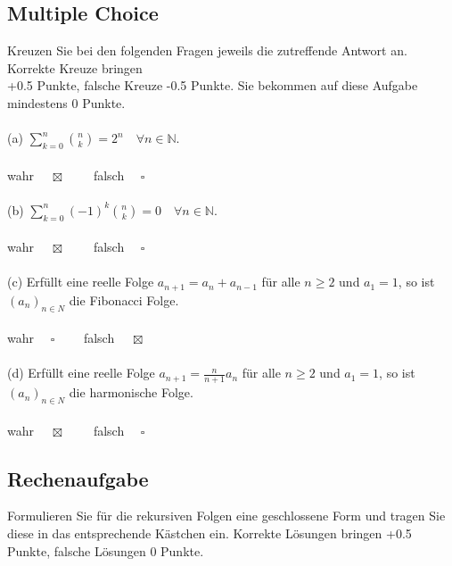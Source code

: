 \documentclass[a4paper]{article}
\begin{document}
\subsection{Multiple Choice}
Kreuzen Sie bei den folgenden Fragen jeweils die zutreffende Antwort an. Korrekte Kreuze bringen\\
+0.5 Punkte, falsche Kreuze -0.5 Punkte. Sie bekommen auf diese Aufgabe mindestens 0 Punkte.\\\\
(a) \(\sum\limits^n_{k=0}\binom{n}{k}=2^n\quad \forall n \in \mathbb{N}\).\\\\
wahr $\quad \boxtimes\quad\quad$ falsch $\quad \square$\\\\
(b) \(\sum\limits^n_{k=0} (-1)^k\binom{n}{k} = 0 \quad \forall n \in \mathbb{N}\).\\\\
wahr $\quad \boxtimes\quad\quad$ falsch $\quad \square$\\\\
(c) Erfüllt eine reelle Folge $a_{n+1} = a_n + a_{n-1}$ für alle $n \geq 2$ und $a_1 = 1$, so ist $(a_n)_{n\in N}$ die Fibonacci Folge.\\\\
wahr $\quad \square\quad\quad$ falsch $\quad \boxtimes$\\\\
(d) Erfüllt eine reelle Folge $a_{n+1} = \frac{n}{n+1}a_n$ für alle $n \geq 2$ und $a_1 = 1$, so ist $(a_n)_{n\in N}$ die harmonische Folge.\\\\
wahr $\quad \boxtimes\quad\quad$ falsch $\quad \square$

\bigskip
\subsection{Rechenaufgabe}
Formulieren Sie für die rekursiven Folgen eine geschlossene Form und tragen Sie diese in das entsprechende Kästchen ein. Korrekte Lösungen bringen +0.5 Punkte, falsche Lösungen 0 Punkte.
\end{document}
